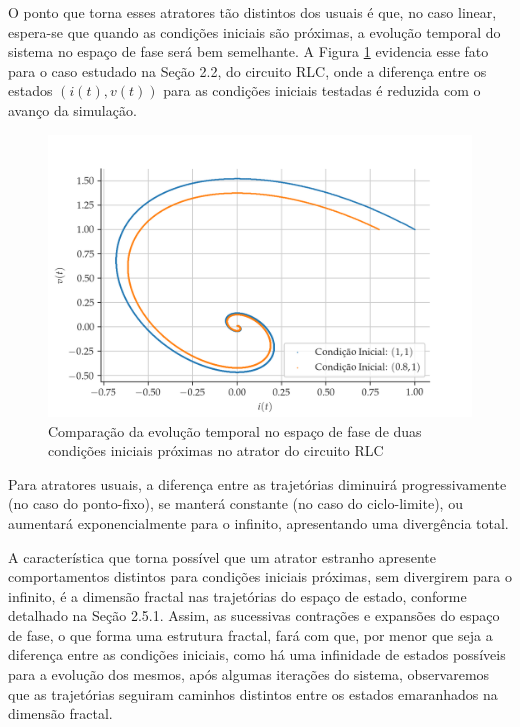 \documentclass[a4paper, 12pt]{article}
\begin{document}
O ponto que torna esses atratores tão distintos dos usuais é que, no caso linear, espera-se que quando as condições iniciais são próximas, a evolução temporal do sistema no espaço de fase será bem semelhante. A Figura \ref{fig:atrator-rlc-comp} evidencia esse fato para o caso estudado na Seção 2.2, do circuito RLC, onde a diferença entre os estados $(i(t), v(t))$ para as condições iniciais testadas é reduzida com o avanço da simulação.
\begin{figure}[!ht]
\centering
\includegraphics[scale = 0.7]{rlc-phase-space-alt.png}
\caption{Comparação da evolução temporal no espaço de fase de duas condições iniciais próximas no atrator do circuito RLC}
\label{fig:atrator-rlc-comp}
\end{figure}

Para atratores usuais, a diferença entre as trajetórias diminuirá progressivamente (no caso do ponto-fixo), se manterá constante (no caso do ciclo-limite), ou aumentará exponencialmente para o infinito, apresentando uma divergência total.

A característica que torna possível que um atrator estranho apresente comportamentos distintos para condições iniciais próximas, sem divergirem para o infinito, é a dimensão fractal nas trajetórias do espaço de estado, conforme detalhado na Seção 2.5.1. Assim, as sucessivas contrações e expansões do espaço de fase, o que forma uma estrutura fractal, fará com que, por menor que seja a diferença entre as condições iniciais, como há uma infinidade de estados possíveis para a evolução dos mesmos, após algumas iterações do sistema, observaremos que as trajetórias seguiram caminhos distintos entre os estados emaranhados na dimensão fractal.
\end{document}
